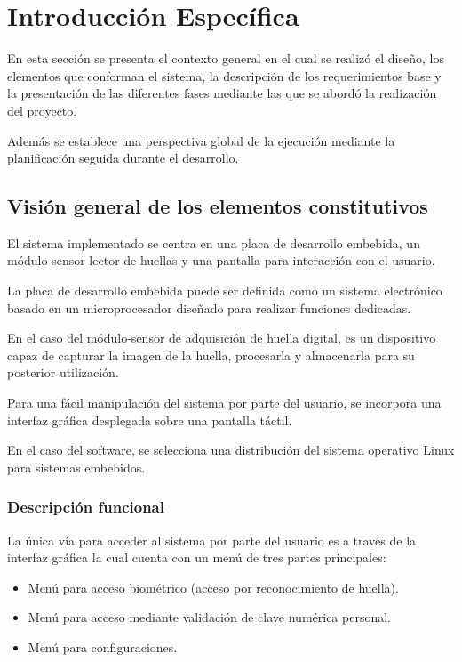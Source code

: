 \chapter{Introducción Específica} %

\label{Chapter2}

En esta sección se presenta el contexto general en el cual se realizó el diseño, los elementos que conforman el sistema, la descripción de los requerimientos base y la presentación de las diferentes fases mediante las que se abordó la realización del proyecto.

Además se establece una perspectiva global de la ejecución mediante la planificación seguida durante el desarrollo.
  
\section{Visión general de los elementos constitutivos}
El sistema implementado se centra en una placa de desarrollo embebida, un módulo-sensor lector de huellas y una pantalla para interacción con el usuario.

La placa de desarrollo embebida puede ser definida como un sistema electrónico basado en un microprocesador diseñado para realizar funciones dedicadas.

En el caso del módulo-sensor de adquisición de huella digital, es un dispositivo capaz de capturar la imagen de la huella, procesarla y almacenarla para su posterior utilización.

Para una fácil manipulación del sistema por parte del usuario, se incorpora una interfaz gráfica desplegada sobre una pantalla táctil.

En el caso del software, se selecciona una distribución del sistema operativo Linux para sistemas embebidos.

\subsection{Descripción funcional}
La única vía para acceder al sistema por parte del usuario es a través de la interfaz gráfica la cual cuenta con un menú  de tres partes principales:

\begin{itemize}
\item Menú para acceso biométrico (acceso por reconocimiento de huella).	
\item Menú para acceso mediante validación de clave numérica personal.
\item Menú para configuraciones.
\end{itemize}

